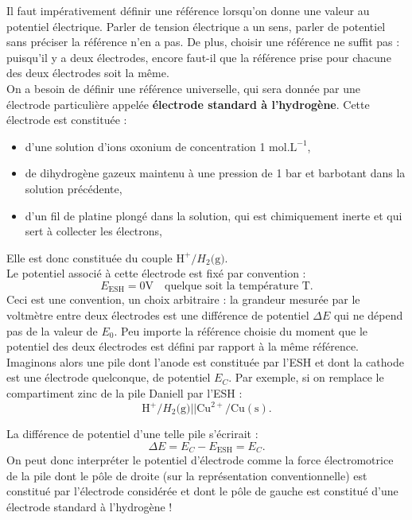 \documentclass[11pt,a4paper]{report}
\begin{document}
Il faut impérativement définir une référence lorsqu'on donne une valeur au potentiel électrique. Parler de tension électrique a un sens, parler de potentiel sans préciser la référence n'en a pas. De plus, choisir une référence ne suffit pas : puisqu'il y a deux électrodes, encore faut-il que la référence prise pour chacune des deux électrodes soit la même.\\

On a besoin de définir une référence universelle, qui sera donnée par une électrode particulière appelée \textbf{électrode standard à l'hydrogène}. Cette électrode est constituée :
\begin{itemize}
	\item d'une solution d'ions oxonium de concentration 1 $\text{mol.L}^{-1}$,
	\item de dihydrogène gazeux maintenu à une pression de 1 bar et barbotant dans la solution précédente,
	\item d'un fil de platine plongé dans la solution, qui est chimiquement inerte et qui sert à collecter les électrons,
\end{itemize}
Elle est donc constituée du couple $\text{H}^+/H_2\text{(g)}$.\\

Le potentiel associé à cette électrode est fixé par convention :
\begin{equation}
	\boxed{E_\text{ESH} = 0 \text{V}} \quad\text{quelque soit la température T.}
\end{equation}
Ceci est une convention, un choix arbitraire : la grandeur mesurée par le voltmètre entre deux électrodes est une différence de potentiel $\Delta E$ qui ne dépend pas de la valeur de $E_0$. Peu importe la référence choisie du moment que le potentiel des deux électrodes est défini par rapport à la même référence.\\

Imaginons alors une pile dont l'anode est constituée par l'ESH et dont la cathode est une électrode quelconque, de potentiel $E_C$. Par exemple, si on remplace le compartiment zinc de la pile Daniell par l'ESH :
	\begin{equation}
		\boxed{\text{H}^+/H_2\text{(g)} || \text{Cu}^{2+}/\text{Cu}(\text{s})}.
	\end{equation}

La différence de potentiel d'une telle pile s'écrirait :
\begin{equation}
	\boxed{\Delta E = E_C - E_\text{ESH} = E_C}.
\end{equation}
On peut donc interpréter le potentiel d'électrode comme la force électromotrice de la pile dont le pôle de droite (sur la représentation conventionnelle) est constitué par l'électrode considérée et dont le pôle de gauche est constitué d'une électrode standard à l'hydrogène !
\end{document}
